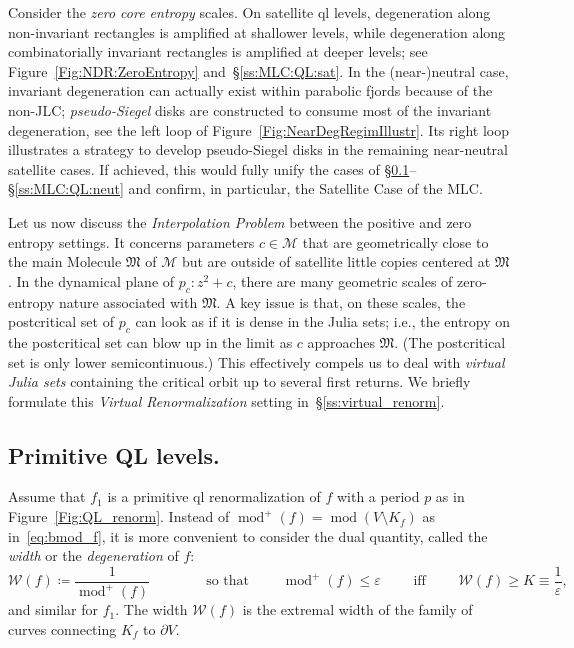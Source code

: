 \documentclass[twoside,leqno]{article}
\theoremstyle{plain}
\newcommand{\Width}{{\mathcal W}}
\renewcommand{\mod}{\operatorname{mod}}
\newcommand\MM{{\mathcal{M}}}
\newcommand\Mol{\mathfrak M}
\newcommand\filled{K}
\renewcommand{\bmod}{ {\operatorname{mod}^+}}
\begin{document}
Consider the \emph{zero core entropy} scales. On satellite ql levels, degeneration along non-invariant rectangles is amplified at shallower levels, while degeneration along combinatorially invariant rectangles is amplified at deeper levels; see Figure~\ref{Fig:NDR:ZeroEntropy} and~\S\ref{ss:MLC:QL:sat}. In the (near-)neutral case, invariant degeneration can actually exist within parabolic fjords because of the non-JLC; \emph{pseudo-Siegel} disks are constructed to consume most of the invariant degeneration, see the left loop of Figure~\ref{Fig:NearDegRegimIllustr}. Its right loop illustrates a strategy to develop pseudo-Siegel disks in the remaining near-neutral satellite cases. If achieved, this would fully unify the cases of \S\ref{ss:NDR:PositiveEntr}--\S\ref{ss:MLC:QL:neut} and confirm, in particular, the Satellite Case of the MLC.


Let us now discuss the \emph{Interpolation Problem} between the positive and zero entropy settings. It concerns parameters $c\in \MM$ that are geometrically close to the main Molecule $\Mol$ of $\MM$ but are outside of satellite little copies centered at $\Mol$. In the dynamical plane of $p_c\colon z^2+c$, there are many geometric scales of zero-entropy nature associated with $\Mol$. A key issue is that, on these scales, the postcritical set of $p_c$ can look as if it is dense in the Julia sets; i.e., the entropy on the postcritical set can blow up in the limit as $c$ approaches $\Mol$. (The postcritical set is only lower semicontinuous.) This effectively compels us to deal with \emph{virtual Julia sets} containing the critical orbit up to several first returns. We briefly formulate this \emph{Virtual Renormalization} setting in~\S\ref{ss:virtual_renorm}. 














 \subsection{Primitive QL levels.}\label{ss:NDR:PositiveEntr} Assume that $f_1$ is a primitive ql renormalization of $f$ with a period $p$ as in Figure~\ref{Fig:QL_renorm}.  Instead of $\bmod(f)=\mod(V\setminus \filled_f)$ as in~\eqref{eq:bmod_f}, it is more convenient to consider the dual quantity, called the \emph{width} or the \emph{degeneration} of $f$:
\begin{equation}  
     \Width(f) \coloneq \frac{1}{\bmod(f)} \qquad\qquad  \text{so that }\qquad \bmod(f)\le \varepsilon \qquad\text{ iff }\qquad  \Width(f)\ge K\equiv \frac{1}\varepsilon,
\end{equation}
and similar for $f_1$. The width $\Width(f)$ is the extremal width of the family of curves connecting $K_f$ to $\partial V$.
\end{document}
